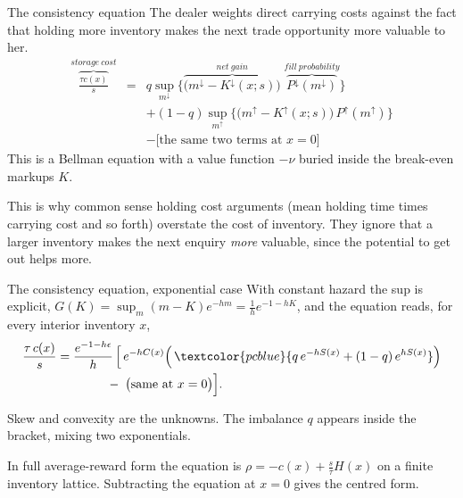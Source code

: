 \documentclass[10pt]{beamer}
\newcommand{\blue}[1]{\textcolor{pcblue}{#1}}
\begin{document}
\begin{frame}{The consistency equation}
The dealer weights direct carrying costs against the fact that holding more inventory makes the next trade opportunity more valuable to her.
{\small\begin{eqnarray*}
\overbrace{\frac{\tau c(x)}{s}}^{storage\ cost} & = & q \sup_{m^{\downarrow}}\Big\{\overbrace{\big(m^{\downarrow} - K^{\downarrow}(x;s)\big)}^{net\ gain}\;\overbrace{P^{\downarrow}(m^{\downarrow})}^{fill\ probability}\Big\} \\
& & + (1-q)\sup_{m^{\uparrow}}\big\{\big(m^{\uparrow} - K^{\uparrow}(x;s)\big)\,P^{\uparrow}(m^{\uparrow})\big\} \\
& & - \big[\text{the same two terms at } x = 0\big]
\end{eqnarray*}}
This is a Bellman equation with a value function $-\nu$ buried inside the break-even markups $K$.
\vspace{0.5em}

This is why common sense holding cost arguments (mean holding time times carrying cost and so forth) overstate the cost of inventory. They ignore that a larger inventory makes the next enquiry \emph{more} valuable, since the potential to get out helps more.
\end{frame}

\begin{frame}{The consistency equation, exponential case}
With constant hazard the sup is explicit, $G(K) = \sup_m (m-K)e^{-hm} = \tfrac{1}{h}e^{-1-hK}$, and the equation reads, for every interior inventory $x$,
\begin{align}
\frac{\tau\, c(x)}{s}
&= \frac{e^{-1-h\epsilon}}{h}\,
\Big[\, e^{-hC(x)}\Big(\,\blue{q\,e^{-hS(x)} + (1-q)\,e^{hS(x)}}\Big) \notag\\
&\qquad\qquad -\; \big(\text{same at } x=0\big) \Big].
\label{eq:bellman}
\end{align}
\vspace{0.5em}

Skew and convexity are the unknowns. The imbalance $q$ appears inside the bracket, mixing two exponentials.
\vspace{0.5em}

In full average-reward form the equation is $\rho = -c(x) + \frac{s}{\tau}H(x)$ on a finite inventory lattice. Subtracting the equation at $x=0$ gives the centred form.
\end{frame}

\end{document}

